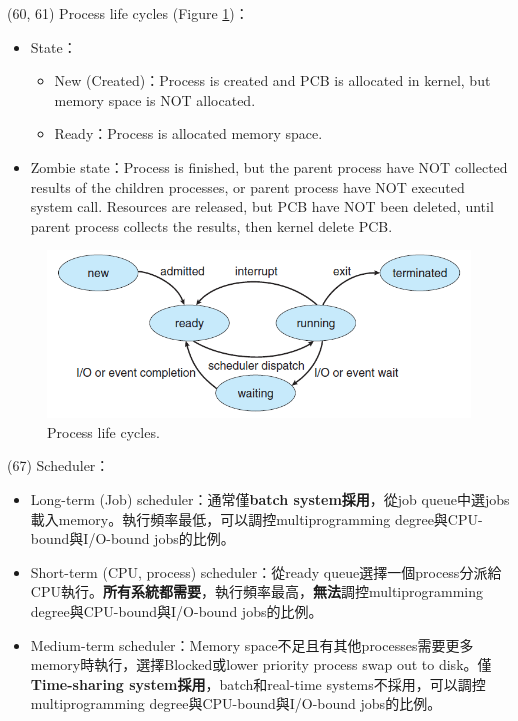 \begin{theorem}{(60, 61)} Process life cycles (Figure \ref{img:process_lifecycles})： \begin{itemize}
        \item State：\begin{itemize}
            \item New (Created)：Process is created and PCB is allocated in kernel, but memory space is NOT allocated.
            \item Ready：Process is allocated memory space.
        \end{itemize}
        \item Zombie state：Process is finished, but the parent process have NOT collected results of the children processes, or parent process have NOT executed  system call. Resources are released, but PCB have NOT been deleted, until parent process collects the results, then kernel delete PCB.
    \end{itemize}
\end{theorem}

\begin{figure}[H]
    \centering
    \includegraphics[scale=0.8]{img/process_lifecycles.png}
    \caption{Process life cycles.}
    \label{img:process_lifecycles}
\end{figure}

\begin{theorem}{(67)} Scheduler：\begin{itemize}
        \item Long-term (Job) scheduler：通常僅\textbf{batch system採用}，從job queue中選jobs載入memory。執行頻率最低，可以調控multiprogramming degree與CPU-bound與I/O-bound jobs的比例。
        \item Short-term (CPU, process) scheduler：從ready queue選擇一個process分派給CPU執行。\textbf{所有系統都需要}，執行頻率最高，\textbf{無法}調控multiprogramming degree與CPU-bound與I/O-bound jobs的比例。
        \item Medium-term scheduler：Memory space不足且有其他processes需要更多memory時執行，選擇Blocked或lower priority process swap out to disk。僅\textbf{Time-sharing system採用}，batch和real-time systems不採用，可以調控multiprogramming degree與CPU-bound與I/O-bound jobs的比例。
    \end{itemize}
\end{theorem}


